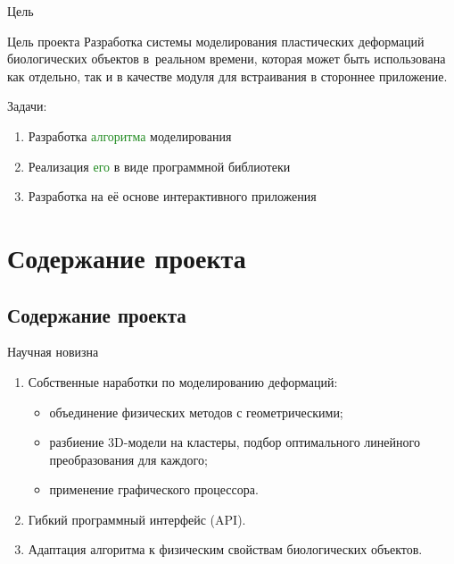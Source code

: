 \documentclass[usenames,dvipsnames,pdftex,unicode,hidelinks]{beamer}
\begin{document}
  \begin{frame}{Цель}
    \begin{block}{Цель проекта}
      Разработка \alert{системы моделирования} пластических деформаций биологических объектов
      \alert{в~реальном времени}, которая может быть использована как отдельно, так и в качестве
      \alert{модуля} для встраивания в стороннее приложение.
    \end{block}

    \vspace{0.5cm}

    Задачи:
    \begin{enumerate}
      \item Разработка \textcolor{ForestGreen}{алгоритма} моделирования
      \item Реализация \textcolor{ForestGreen}{его} в виде \textcolor{RoyalPurple}{программной библиотеки}
      \item Разработка на \textcolor{RoyalPurple}{её} основе \textcolor{NavyBlue}{интерактивного приложения}
    \end{enumerate}
  \end{frame}

  \section{Содержание проекта}
  \subsection{Содержание проекта}
  \begin{frame}{Научная новизна}
    \begin{enumerate}
      \item Собственные наработки по моделированию деформаций:
        \begin{itemize}
          \item объединение физических методов с геометрическими;
          \item разбиение 3D-модели на кластеры, подбор оптимального линейного преобразования для
            каждого;
          \item применение графического процессора.
        \end{itemize}
      \item Гибкий программный интерфейс (API).
      \item Адаптация алгоритма к физическим свойствам биологических объектов.
    \end{enumerate}
  \end{frame}
\end{document}
